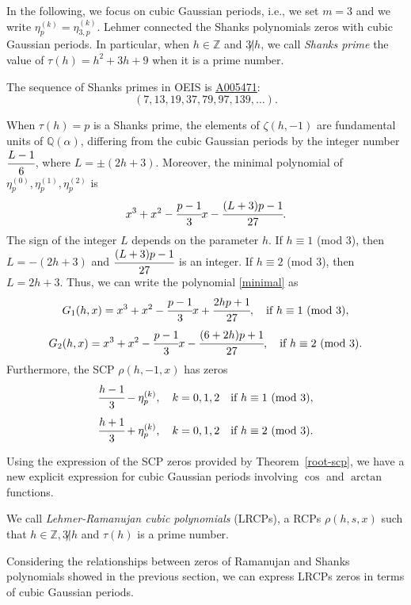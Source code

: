 \documentclass[12pt,reqno]{article}
\newcommand{\seqnum}[1]{\href{http://oeis.org/#1}{\underline{#1}}}
\begin{document}
In the following, we focus on cubic Gaussian periods, i.e., we set $m=3$ and we write $\eta_p^{(k)}=\eta_{3,p}^{(k)}$. Lehmer \cite{Le} connected the Shanks polynomials zeros with cubic Gaussian periods. In particular, when $h\in\mathbb Z$ and $3\not|h$, we call \emph{Shanks prime} the value of $\tau(h)=h^2+3h+9$ when it is a prime number.
\begin{remark} The sequence of Shanks primes in OEIS \cite{oeis} is \seqnum{A005471}:
$$(7, 13, 19, 37, 79, 97, 139,\ldots).$$
\end{remark} 
When $\tau(h)=p$ is a Shanks prime, the elements of $\zeta(h,-1)$  are fundamental units of $\mathbb Q(\alpha)$, differing from the cubic Gaussian periods by the integer number $\cfrac{L-1}{6}$, where $L=\pm(2h+3)$. Moreover, the minimal polynomial of $\eta_p^{(0)},\eta_p^{(1)},\eta_p^{(2)}$ is
\begin{equation} \label{minimal} x^3+x^2-\cfrac{p-1}{3}x-\cfrac{(L+3)p-1}{27}. \end{equation}
The sign of the integer $L$ depends on the parameter $h$. If $h\equiv 1$ (mod $3$), then $L=-(2h+3)$ and $\cfrac{(L+3)p-1}{27}$ is an integer. If $h\equiv 2$ (mod $3$), then $L=2h+3$. Thus, we can write the polynomial \eqref{minimal} as
$$G_1(h,x)=x^3+x^2-\cfrac{p-1}{3}x+\cfrac{2hp+1}{27},\quad \text{if} \ h\equiv 1 \ (\text{mod}\ 3),$$
$$G_2(h,x)=x^3+x^2-\cfrac{p-1}{3}x-\cfrac{(6+2h)p+1}{27},\quad \text{if} \ h\equiv 2 \ (\text{mod}\ 3).$$
Furthermore, the SCP $\rho(h,-1,x)$ has zeros
\begin{equation} \label{p1}  \cfrac{h-1}{3}-\eta_p^{(k)},\quad k=0,1,2\quad \text{if} \ h\equiv 1 \ (\text{mod}\ 3), \end{equation}
\begin{equation} \label{p2} \cfrac{h+1}{3}+\eta_p^{(k)},\quad k=0,1,2\quad \text{if} \ h\equiv 2\ (\text{mod} \ 3). \end{equation}
\begin{remark}
Using the expression of the SCP zeros provided by Theorem~\ref{root-scp}, we have a new explicit expression for cubic Gaussian periods involving $\cos$ and $\arctan$ functions.
\end{remark}
\begin{definition}
We call \emph{Lehmer-Ramanujan cubic polynomials} (LRCPs), a RCPs $\rho(h,s,x)$ such that $h \in \mathbb{Z}, 3\not | h$ and $\tau(h)$ is a prime number.
\end{definition}
Considering the relationships between zeros of Ramanujan and Shanks polynomials showed in the previous section, we can express LRCPs zeros in terms of cubic Gaussian periods.
\end{document}
